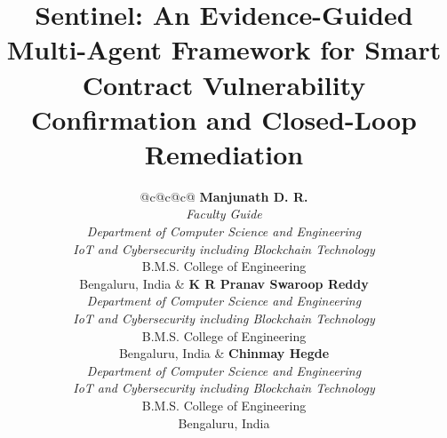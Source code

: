 \documentclass[conference,a4paper,10pt]{IEEEtran}
\begin{document}
\title{Sentinel: An Evidence-Guided Multi-Agent Framework for Smart Contract Vulnerability Confirmation and Closed-Loop Remediation
}
\author{
\small
\begin{tabular}{@{}c@{\hspace{0.025\textwidth}}c@{\hspace{0.025\textwidth}}c@{}}
\parbox{0.29\textwidth}{\centering\textbf{Manjunath D. R.}\\[-0.2ex]\textit{Faculty Guide}\\[-0.2ex]\textit{Department of Computer Science and Engineering}\\\textit{IoT and Cybersecurity including Blockchain Technology}\\B.M.S. College of Engineering\\Bengaluru, India} &
\parbox{0.29\textwidth}{\centering\textbf{K R Pranav Swaroop Reddy}\\\textit{Department of Computer Science and Engineering}\\\textit{IoT and Cybersecurity including Blockchain Technology}\\B.M.S. College of Engineering\\Bengaluru, India} &
\parbox{0.29\textwidth}{\centering\textbf{Chinmay Hegde}\\\textit{Department of Computer Science and Engineering}\\\textit{IoT and Cybersecurity including Blockchain Technology}\\B.M.S. College of Engineering\\Bengaluru, India}\\[1.6em]
\end{tabular}
}
\maketitle
\thispagestyle{empty}
\end{document}

